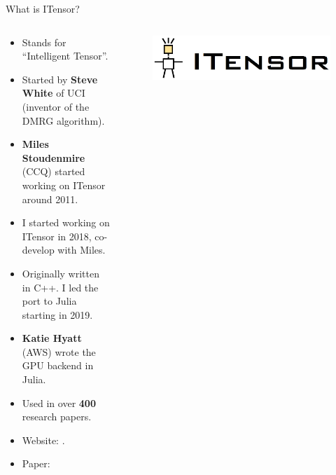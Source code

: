 \begin{frame}{What is ITensor?}

\begin{columns}

  \begin{column}[T]{0.7\textwidth}%

    \begin{itemize}[<+->]

      \item Stands for ``Intelligent Tensor''.
      \item Started by \textbf{Steve White} of UCI (inventor of the DMRG algorithm).
      \item \textbf{Miles Stoudenmire} (CCQ) started working on ITensor around 2011.
      \item I started working on ITensor in 2018, co-develop with Miles.
      \item Originally written in C++. I led the port to Julia starting in 2019.
      \item \textbf{Katie Hyatt} (AWS) wrote the GPU backend in Julia.
      \item Used in over \textbf{400} research papers.
      \item Website: .
      \item Paper: 

    \end{itemize}

  \end{column}

  \begin{column}[T]{0.3\textwidth}%

    \begin{figure}[T]
      \includegraphics[width=1.0\textwidth]{
        slides/assets/what-is-itensor-itensor.jpg
      }
    \end{figure}

    \begin{columns}

      \begin{column}[T]{0.5\textwidth}%


\end{column}
\end{columns}
\end{column}
\end{columns}
\end{frame}
